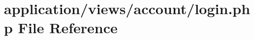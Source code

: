 \hypertarget{account_2login_8php}{\section{application/views/account/login.php File Reference}
\label{account_2login_8php}
}
